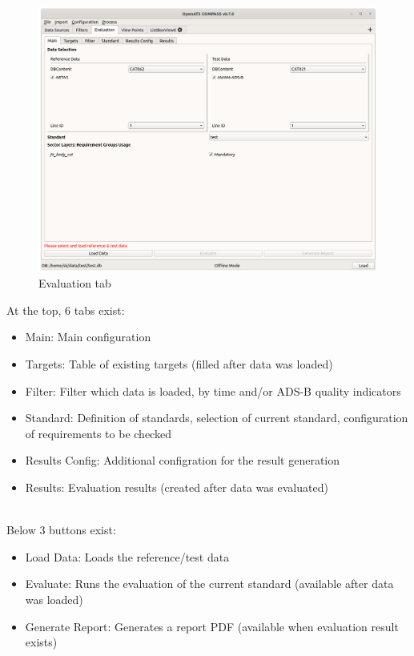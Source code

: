 \begin{figure}[H]
    \hspace*{-2.5cm}
    \includegraphics[width=19cm]{figures/eval.png}
  \caption{Evaluation tab}
\end{figure}

At the top, 6 tabs exist:
\begin{itemize}  
\item Main: Main configuration
\item Targets: Table of existing targets (filled after data was loaded)
\item Filter: Filter which data is loaded, by time and/or ADS-B quality indicators
\item Standard: Definition of standards, selection of current standard, configuration of requirements to be checked
\item Results Config: Additional configration for the result generation
\item Results: Evaluation results (created after data was evaluated)
\end{itemize}
\ \\

Below 3 buttons exist:
\begin{itemize}  
\item Load Data: Loads the reference/test data
\item Evaluate: Runs the evaluation of the current standard (available after data was loaded)
\item Generate Report: Generates a report PDF (available when evaluation result exists)
\end{itemize}
\ \\

